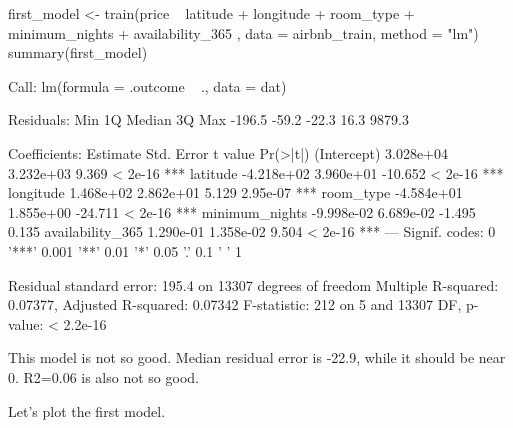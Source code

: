 \begin{Schunk}
\begin{Sinput}
first_model <- train(price ~ latitude + longitude + room_type + minimum_nights  + availability_365 , data = airbnb_train, method = "lm")
summary(first_model)
\end{Sinput}
\begin{Soutput}

Call:
lm(formula = .outcome ~ ., data = dat)

Residuals:
   Min     1Q Median     3Q    Max 
-196.5  -59.2  -22.3   16.3 9879.3 

Coefficients:
                   Estimate Std. Error t value Pr(>|t|)    
(Intercept)       3.028e+04  3.232e+03   9.369  < 2e-16 ***
latitude         -4.218e+02  3.960e+01 -10.652  < 2e-16 ***
longitude         1.468e+02  2.862e+01   5.129 2.95e-07 ***
room_type        -4.584e+01  1.855e+00 -24.711  < 2e-16 ***
minimum_nights   -9.998e-02  6.689e-02  -1.495    0.135    
availability_365  1.290e-01  1.358e-02   9.504  < 2e-16 ***
---
Signif. codes:  0 '***' 0.001 '**' 0.01 '*' 0.05 '.' 0.1 ' ' 1

Residual standard error: 195.4 on 13307 degrees of freedom
Multiple R-squared:  0.07377,   Adjusted R-squared:  0.07342 
F-statistic:   212 on 5 and 13307 DF,  p-value: < 2.2e-16
\end{Soutput}
\end{Schunk}

This model is not so good. Median residual error is -22.9, while it
should be near 0. R2=0.06 is also not so good.

Let's plot the first model.

